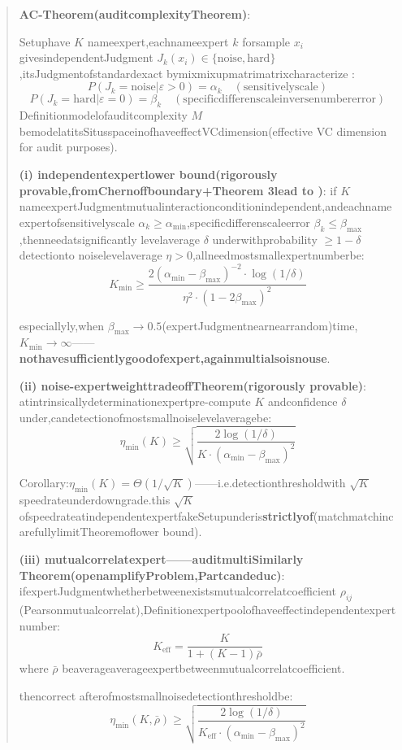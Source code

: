 \documentclass[
  12pt,
]{article}
\begin{document}
\begin{quote}
\textbf{AC-Theorem(auditcomplexityTheorem)}:

Setuphave \(K\) nameexpert,eachnameexpert \(k\) forsample \(x_i\) givesindependentJudgment
\(J_k(x_i) \in \{\text{noise}, \text{hard}\}\),itsJudgmentofstandardexact bymixmixupmatrimatrixcharacterize :
\[P(J_k = \text{noise} | \varepsilon > 0) = \alpha_k \quad (\text{sensitivelyscale})\]
\[P(J_k = \text{hard} | \varepsilon = 0) = \beta_k \quad (\text{specificdifferenscaleinversenumbererror})\]
Definitionmodelofauditcomplexity \(M\) bemodelatitsSitusspaceinofhaveeffectVCdimension(effective VC
dimension for audit purposes).

\textbf{(i) independentexpertlower bound(rigorously provable,fromChernoffboundary+Theorem 3lead to )}: if
\(K\) nameexpertJudgmentmutualinteractionconditionindependent,andeachnameexpertofsensitivelyscale
\(\alpha_k \geq \alpha_{\min}\),specificdifferenscaleerror
\(\beta_k \leq \beta_{\max}\),thenneedatsignificantly levelaverage \(\delta\) underwithprobability
\(\geq 1-\delta\) detectionto noiselevelaverage \(\eta > 0\),allneedmostsmallexpertnumberbe:
\[K_{\min} \geq \frac{2(\alpha_{\min} - \beta_{\max})^{-2} \cdot \log(1/\delta)}{\eta^2 \cdot (1 - 2\beta_{\max})^2}\]

especiallyly,when
\(\beta_{\max} \to 0.5\)(expertJudgmentnearnearrandom)time,\(K_{\min} \to \infty\)------\textbf{nothavesufficientlygoodofexpert,againmultialsoisnouse}.

\textbf{(ii) noise-expertweighttradeoffTheorem(rigorously provable)}: atintrinsicallydeterminationexpertpre-compute \(K\)
andconfidence \(\delta\) under,candetectionofmostsmallnoiselevelaveragebe:
\[\eta_{\min}(K) \geq \sqrt{\frac{2\log(1/\delta)}{K \cdot (\alpha_{\min} - \beta_{\max})^2}}\]

Corollary:\(\eta_{\min}(K) = \Theta(1/\sqrt{K})\)------i.e.detectionthresholdwith
\(\sqrt{K}\) speedrateunderdowngrade.this  \(\sqrt{K}\)
ofspeedrateatindependentexpertfakeSetupunderis\textbf{strictlyof}(matchmatchincarefullylimitTheoremoflower bound).

\textbf{(iii) mutualcorrelatexpert------auditmultiSimilarly Theorem(openamplifyProblem,Partcandeduc)}:
ifexpertJudgmentwhetherbetweenexistsmutualcorrelatcoefficient
\(\rho_{ij}\)(Pearsonmutualcorrelat),Definitionexpertpoolofhaveeffectindependentexpertnumber:
\[K_{\text{eff}} = \frac{K}{1 + (K-1)\bar{\rho}}\] where \(\bar{\rho}\)
beaverageaverageexpertbetweenmutualcorrelatcoefficient.

thencorrect afterofmostsmallnoisedetectionthresholdbe:
\[\eta_{\min}(K, \bar{\rho}) \geq \sqrt{\frac{2\log(1/\delta)}{K_{\text{eff}} \cdot (\alpha_{\min} - \beta_{\max})^2}}\]


\end{quote}
\end{document}
